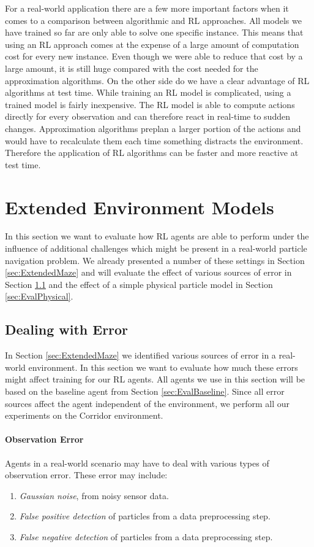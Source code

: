 For a real-world application there are a few more important factors when it comes to a comparison between algorithmic and RL approaches. All models we have trained so far are only able to solve one specific instance. This means that using an RL approach comes at the expense of a large amount of computation cost for every new instance. Even though we were able to reduce that cost by a large amount, it is still huge compared with the cost needed for the approximation algorithms. On the other side do we have a clear advantage of RL algorithms at test time. While training an RL model is complicated, using a trained model is fairly inexpensive. The RL model is able to compute actions directly for every observation and can therefore react in real-time to sudden changes. Approximation algorithms preplan a larger portion of the actions and would have to recalculate them each time something distracts the environment. Therefore the application of RL algorithms can be faster and more reactive at test time.

\section{Extended Environment Models} \label{sec:EvalExtendedModels}
In this section we want to evaluate how RL agents are able to perform under the influence of additional challenges which might be present in a real-world particle navigation problem. We already presented a number of these settings in Section \ref{sec:ExtendedMaze} and will evaluate the effect of various sources of error in Section \ref{sec:EvalError} and the effect of a simple physical particle model in Section \ref{sec:EvalPhysical}.

\subsection{Dealing with Error} \label{sec:EvalError}
In Section \ref{sec:ExtendedMaze} we identified various sources of error in a real-world environment. In this section we want to evaluate how much these errors might affect training for our RL agents. All agents we use in this section will be based on the baseline agent from Section \ref{sec:EvalBaseline}. Since all error sources affect the agent independent of the environment, we perform all our experiments on the Corridor environment.

\paragraph{Observation Error}
Agents in a real-world scenario may have to deal with various types of observation error. These error may include:
\begin{enumerate}
    \item \textit{Gaussian noise}, from noisy sensor data.
    \item \textit{False positive detection} of particles from a data preprocessing step.
    \item \textit{False negative detection} of particles from a data preprocessing step.
\end{enumerate}

